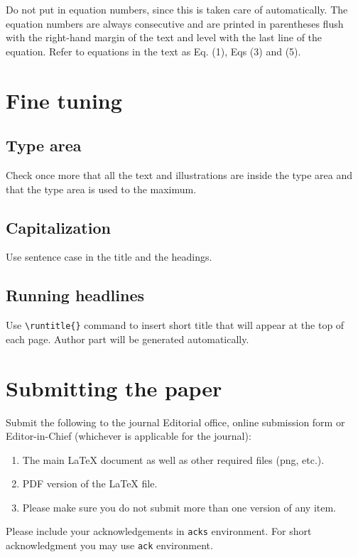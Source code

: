 \documentclass[ds]{iosart2x}
\begin{document}
Do not put in equation numbers, since this is taken care of
automatically. The equation numbers are always consecutive and are
printed in parentheses flush with the right-hand margin of the text and
level with the last line of the equation.
Refer to equations in the text as Eq. (1), Eqs (3) and (5).


\section{Fine tuning}
\subsection{Type area}
Check once more that all the text and illustrations are inside the type area and
that the type area is used to the maximum.

\subsection{Capitalization}
Use sentence case in the title and the headings.

\subsection{Running headlines}
Use \verb|\runtitle{}| command to insert short title that will appear at the top of each page. Author part will be generated automatically.

\section{Submitting the paper}
Submit the following to the journal Editorial office, online submission form or Editor-in-Chief (whichever is applicable for the journal):

\begin{enumerate}
\item The main \LaTeX{} document as well as other required files (png, etc.).
\item PDF version of the \LaTeX{} file.
\item Please make sure you do not submit more than one version of any item.
\end{enumerate}


\begin{acks}
Please include your acknowledgements in \verb|acks| environment. For short acknowledgment you may use \verb|ack| environment.
\end{acks}
\end{document}
